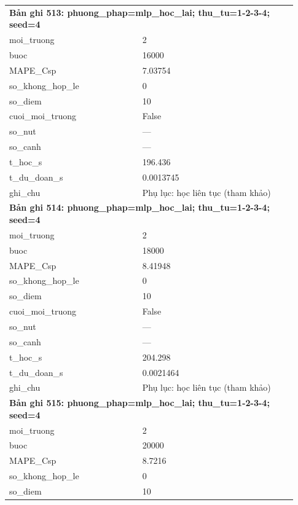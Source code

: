 \begin{longtable}{p{0.43\linewidth}p{0.50\linewidth}}
\midrule
\multicolumn{2}{p{0.95\linewidth}}{\textbf{Bản ghi 513: phuong\_phap=mlp\_hoc\_lai; thu\_tu=1-2-3-4; seed=4}} \\
moi\_\allowbreak truong & 2 \\
buoc & 16000 \\
MAPE\_\allowbreak Csp & 7.03754 \\
so\_\allowbreak khong\_\allowbreak hop\_\allowbreak le & 0 \\
so\_\allowbreak diem & 10 \\
cuoi\_\allowbreak moi\_\allowbreak truong & False \\
so\_\allowbreak nut & — \\
so\_\allowbreak canh & — \\
t\_\allowbreak hoc\_\allowbreak s & 196.436 \\
t\_\allowbreak du\_\allowbreak doan\_\allowbreak s & 0.0013745 \\
ghi\_\allowbreak chu & Phụ lục: học liên tục (tham khảo) \\
\midrule
\multicolumn{2}{p{0.95\linewidth}}{\textbf{Bản ghi 514: phuong\_phap=mlp\_hoc\_lai; thu\_tu=1-2-3-4; seed=4}} \\
moi\_\allowbreak truong & 2 \\
buoc & 18000 \\
MAPE\_\allowbreak Csp & 8.41948 \\
so\_\allowbreak khong\_\allowbreak hop\_\allowbreak le & 0 \\
so\_\allowbreak diem & 10 \\
cuoi\_\allowbreak moi\_\allowbreak truong & False \\
so\_\allowbreak nut & — \\
so\_\allowbreak canh & — \\
t\_\allowbreak hoc\_\allowbreak s & 204.298 \\
t\_\allowbreak du\_\allowbreak doan\_\allowbreak s & 0.0021464 \\
ghi\_\allowbreak chu & Phụ lục: học liên tục (tham khảo) \\
\midrule
\multicolumn{2}{p{0.95\linewidth}}{\textbf{Bản ghi 515: phuong\_phap=mlp\_hoc\_lai; thu\_tu=1-2-3-4; seed=4}} \\
moi\_\allowbreak truong & 2 \\
buoc & 20000 \\
MAPE\_\allowbreak Csp & 8.7216 \\
so\_\allowbreak khong\_\allowbreak hop\_\allowbreak le & 0 \\
so\_\allowbreak diem & 10 \\

\end{longtable}
